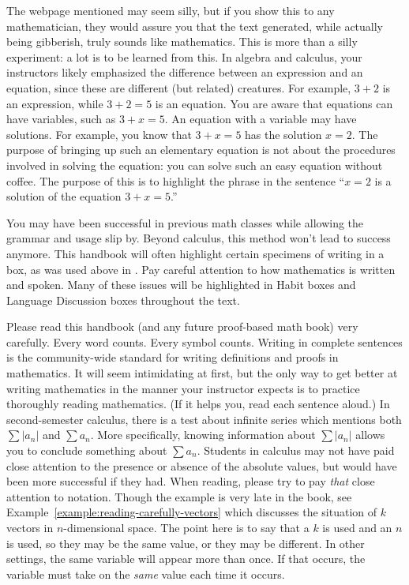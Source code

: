 \documentclass{book}
\theoremstyle{ekimcustom}
\begin{document}
The webpage mentioned may seem silly, but if you show this to any mathematician, they would assure you that the text generated, while actually being gibberish, truly sounds like mathematics. This is more than a silly experiment: a lot is to be learned from this. In algebra and calculus, your instructors likely emphasized the difference between an expression and an equation, since these are different (but related) creatures. For example, $3+2$ is an expression, while $3+2=5$ is an equation. You are aware that equations can have variables, such as $3+x=5$. An equation with a variable may have solutions. For example, you know that $3+x=5$ has the solution $x=2$. The purpose of bringing up such an elementary equation is not about the procedures involved in solving the equation: you can solve such an easy equation without coffee. The purpose of this is to highlight the phrase  in the sentence ``$x=2$ is a solution of the equation $3+x=5$.''

You may have been successful in previous math classes while allowing the grammar and usage slip by. Beyond calculus, this method won't lead to success anymore. This handbook will often highlight certain specimens of writing in a box, as was used above in . Pay careful attention to how mathematics is written and spoken. Many of these issues will be highlighted in Habit boxes and Language Discussion boxes throughout the text.

Please read this handbook (and any future proof-based math book) very carefully. Every word counts. Every symbol counts. Writing in complete sentences is the community-wide standard for writing definitions and proofs in mathematics. It will seem intimidating at first, but the only way to get better at writing mathematics in the manner your instructor expects is to practice thoroughly reading mathematics. (If it helps you, read each sentence aloud.) In second-semester calculus, there is a test about infinite series which mentions both $\sum |a_n|$ and $\sum a_n$. More specifically, knowing information about $\sum |a_n|$ allows you to conclude something about $\sum a_n$. Students in calculus may not have paid close attention to the presence or absence of the absolute values, but would have been more successful if they had. When reading, please try to pay \emph{that} close attention to notation. Though the example is very late in the book, see Example~\ref{example:reading-carefully-vectors} which discusses the situation of $k$ vectors in $n$-dimensional space. The point here is to say that a $k$ is used and an $n$ is used, so they may be the same value, or they may be different. In other settings, the same variable will appear more than once. If that occurs, the variable must take on the \emph{same} value each time it occurs.
\end{document}
